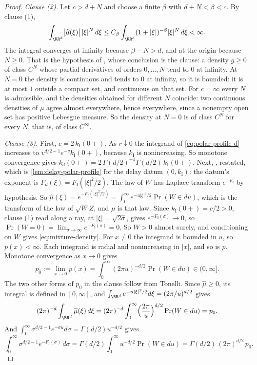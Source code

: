 \begin{proof}
\emph{Clause (2).} Let $c > d+N$ and choose a finite $\beta$ with $d + N < \beta < c$. By clause
(1),
\[
  \int_{\RR^d}\bigl|\widehat\mu(\xi)\bigr|\,|\xi|^N\,d\xi
   \le C_\beta\int_{\RR^d}(1+|\xi|)^{-\beta}|\xi|^N\,d\xi < \infty .
\]
The integral converges at infinity because $\beta - N > d$, and at the origin because $N \ge 0$.
That is the hypothesis of , whose conclusion is the clause: a density $g \ge 0$ of
class $C^N$ whose partial derivatives of orders $0,\dots,N$ tend to $0$ at infinity.
At $N = 0$ the density is continuous and tends to $0$ at infinity, so it is bounded: it is at most
$1$ outside a compact set, and continuous on that set. For $c = \infty$ every $N$ is admissible,
and the densities obtained for different $N$ coincide: two continuous densities of $\mu$ agree
almost everywhere, hence everywhere, since a nonempty open set has positive Lebesgue measure. So the
density at $N = 0$ is of class $C^N$ for every $N$, that is, of class $C^\infty$.

\emph{Clause (3).} First, $c = 2\,k_{\mathrm I}(0{+})$. As $r \downarrow 0$ the integrand of
\ref{eq:polar-profile-d} increases to $v^{d/2-1}e^{-v}k_{\mathrm I}(0{+})$, because $k_{\mathrm I}$
is nonincreasing. So monotone convergence gives
$k_d(0{+}) = 2\,\Gamma(d/2)^{-1}\Gamma(d/2)\,k_{\mathrm I}(0{+})$. Next, ,
restated, which is \ref{lem:delay-polar-profile} for the delay datum $(0,k_{\mathrm I})$: the datum's exponent is $F_d(\xi) = F_{\mathrm I}(|\xi|^2/2)$. The law of $W$ has Laplace
transform $e^{-F_{\mathrm I}}$ by hypothesis. So
$\widehat\mu(\xi) = e^{-F_{\mathrm I}(|\xi|^2/2)} = \int_0^\infty e^{-u|\xi|^2/2}\Pr(W \in du)$,
which is the transform of the law of $\sqrt{W}Z$, and $\mu$ is that law. Since
$k_{\mathrm I}(0{+}) = c/2 > 0$, clause (1) read along a ray, at $|\xi| = \sqrt{2\sigma}$, gives
$e^{-F_{\mathrm I}(\sigma)} \to 0$, so
$\Pr(W = 0) = \lim_{\sigma\to\infty}e^{-F_{\mathrm I}(\sigma)} = 0$. So $W > 0$ almost surely,
and conditioning on $W$ gives \ref{eq:mixture-density}. For $x \ne 0$ the integrand is bounded in
$u$, so $p(x) < \infty$. Each integrand is radial and nonincreasing in $|x|$, and so is $p$.
Monotone convergence as $x \to 0$ gives
\[
  p_0 := \lim_{x\to0}p(x) = \int_0^\infty (2\pi u)^{-d/2}\Pr(W \in du) \in (0,\infty] .
\]
The two other forms of $p_0$ in the clause follow from Tonelli. Since $\widehat\mu \ge 0$, its
integral is defined in $[0,\infty]$, and $\int_{\RR^d}e^{-u|\xi|^2/2}d\xi = (2\pi/u)^{d/2}$ gives
\[
  (2\pi)^{-d}\int_{\RR^d}\widehat\mu(\xi)\,d\xi
   = (2\pi)^{-d}\int_0^\infty\Bigl(\frac{2\pi}{u}\Bigr)^{d/2}\Pr(W \in du) = p_0 .
\]
And $\int_0^\infty\sigma^{d/2-1}e^{-\sigma u}d\sigma = \Gamma(d/2)u^{-d/2}$ gives
\[
  \int_0^\infty\sigma^{d/2-1}e^{-F_{\mathrm I}(\sigma)}\,d\sigma
   = \Gamma(d/2)\int_0^\infty u^{-d/2}\Pr(W \in du) = \Gamma(d/2)\,(2\pi)^{d/2}\,p_0 .
\]


\end{proof}
